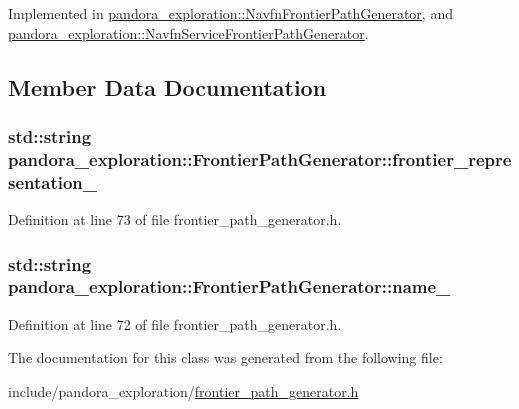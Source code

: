 \-Implemented in \hyperlink{classpandora__exploration_1_1_navfn_frontier_path_generator_a663edd4bc478458e1c5176a81422a51d}{pandora\-\_\-exploration\-::\-Navfn\-Frontier\-Path\-Generator}, and \hyperlink{classpandora__exploration_1_1_navfn_service_frontier_path_generator_ae2cd2c3d535fec0eef9a642c7d2e146a}{pandora\-\_\-exploration\-::\-Navfn\-Service\-Frontier\-Path\-Generator}.



\subsection{\-Member \-Data \-Documentation}
\hypertarget{classpandora__exploration_1_1_frontier_path_generator_a90b18efa8b2e309d7217eb0610c70ae3}{
\subsubsection[{frontier\-\_\-representation\-\_\-}]{\setlength{\rightskip}{0pt plus 5cm}std\-::string {\bf pandora\-\_\-exploration\-::\-Frontier\-Path\-Generator\-::frontier\-\_\-representation\-\_\-}}}\label{classpandora__exploration_1_1_frontier_path_generator_a90b18efa8b2e309d7217eb0610c70ae3}


\-Definition at line 73 of file frontier\-\_\-path\-\_\-generator.\-h.

\hypertarget{classpandora__exploration_1_1_frontier_path_generator_add6fdfc632176b966973053451a80bb2}{
\subsubsection[{name\-\_\-}]{\setlength{\rightskip}{0pt plus 5cm}std\-::string {\bf pandora\-\_\-exploration\-::\-Frontier\-Path\-Generator\-::name\-\_\-}}}\label{classpandora__exploration_1_1_frontier_path_generator_add6fdfc632176b966973053451a80bb2}


\-Definition at line 72 of file frontier\-\_\-path\-\_\-generator.\-h.



\-The documentation for this class was generated from the following file\-:\begin{DoxyCompactItemize}
\item 
include/pandora\-\_\-exploration/\hyperlink{frontier__path__generator_8h}{frontier\-\_\-path\-\_\-generator.\-h}\end{DoxyCompactItemize}
